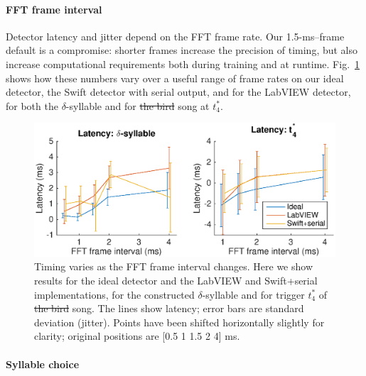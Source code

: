 \documentclass[10pt,letterpaper]{article}
\newcommand\fig[1]{Fig.~\ref{#1}}
\renewcommand{\subsubsection}[1]{\paragraph{#1}}
\providecommand{\DIFaddtex}[1]{{\protect\color{blue}\uwave{#1}}} %
\providecommand{\DIFdeltex}[1]{{\protect\color{red}\sout{#1}}}                      %
\providecommand{\DIFaddbegin}{} %
\providecommand{\DIFaddend}{} %
\providecommand{\DIFdelbegin}{} %
\providecommand{\DIFdelend}{} %
\providecommand{\DIFaddFL}[1]{\DIFadd{#1}} %
\providecommand{\DIFdelFL}[1]{\DIFdel{#1}} %
\providecommand{\DIFaddbeginFL}{} %
\providecommand{\DIFaddendFL}{} %
\providecommand{\DIFdelbeginFL}{} %
\providecommand{\DIFdelendFL}{} %
\providecommand{\DIFadd}[1]{\texorpdfstring{\DIFaddtex{#1}}{#1}} %
\providecommand{\DIFdel}[1]{\texorpdfstring{\DIFdeltex{#1}}{}} %
\begin{document}
\subsubsection{FFT frame interval}

Detector latency and jitter depend on the FFT frame rate.  Our
1.5-ms--frame default is a compromise: shorter frames increase the
precision of timing, but also increase computational requirements both
during training and at runtime.  \fig{fig:TimingVsFrame} shows how
these numbers vary over a useful range of frame rates on our ideal
detector, the Swift detector with serial output, and for the LabVIEW
detector, for both the $\delta$-syllable and for \DIFdelbegin \DIFdel{the bird }\DIFdelend \DIFaddbegin \DIFadd{lny64's }\DIFaddend song at
$t^*_4$.

\begin{figure}
  \includegraphics[width=\textwidth]{Fig4}
  \caption{Timing varies as the FFT frame interval changes.  Here we
    show results for the ideal detector and the LabVIEW and
    Swift+serial implementations, for the constructed
    $\delta$-syllable and for trigger $t^*_4$ of \DIFdelbeginFL \DIFdelFL{the bird }\DIFdelendFL \DIFaddbeginFL \DIFaddFL{lny64's }\DIFaddendFL song.  The
    lines show latency; error bars are standard deviation (jitter).  Points have
    been shifted horizontally slightly for clarity; original positions are [0.5 1
      1.5 2 4] ms.}
  \label{fig:TimingVsFrame}
\end{figure}

\subsubsection{Syllable choice}
\end{document}
